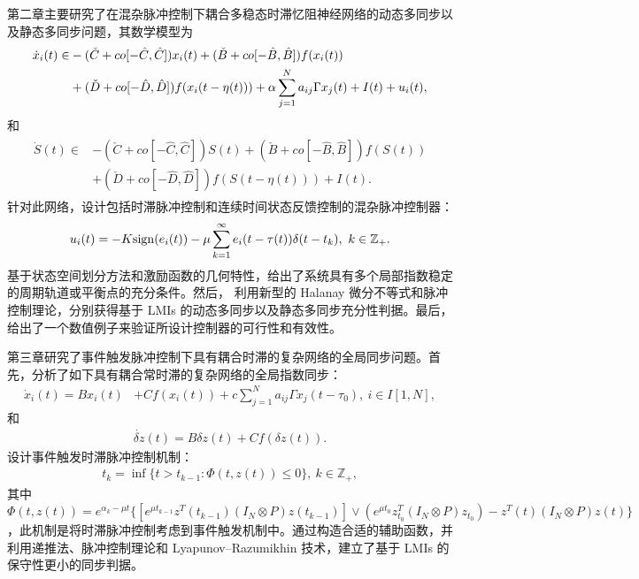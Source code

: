  
第二章主要研究了在混杂脉冲控制下耦合多稳态时滞忆阻神经网络的动态多同步以及静态多同步问题，其数学模型为
    \begin{align*} 
    \begin{split}
    \dot{x}_i(t)\in&- (\check{C}+co[-\hat{C},\hat{C}]) x_i(t)+(\check{B}+co[-\hat{B},\hat{B}])f(x_i(t)) \\
    &+(\check{D}+co[-\hat{D},\hat{D}])f(x_i(t-\eta(t)))
    +\alpha\sum\limits\limits_{j=1}^{N}a_{ij}\Gamma x_j(t)+I(t)+u_i(t),
    \end{split}
    \end{align*}
和 
    \begin{align*} 
    \begin{split}
    \dot{S}(t)\in&- (\check{C}+co[-\hat{C},\hat{C}]) S(t)+(\check{B}+co[-\hat{B},\hat{B}])f(S(t)) \\
    &+(\check{D}+co[-\hat{D},\hat{D}])f(S(t-\eta(t)))+I(t).
    \end{split}
    \end{align*}
针对此网络，设计包括时滞脉冲控制和连续时间状态反馈控制的混杂脉冲控制器：
\begin{align*} 
u_i(t)=-K {\rm sign}(e_i(t))-\mu\sum\limits_{k=1}^{\infty}e_i(t-\tau(t))\delta(t-t_k),\ k\in\mathbb{Z}_+.
\end{align*}
基于状态空间划分方法和激励函数的几何特性，给出了系统具有多个局部指数稳定的周期轨道或平衡点的充分条件。然后， 利用新型的 Halanay 微分不等式和脉冲控制理论，分别获得基于 LMIs 的动态多同步以及静态多同步充分性判据。最后，给出了一个数值例子来验证所设计控制器的可行性和有效性。
 
第三章研究了事件触发脉冲控制下具有耦合时滞的复杂网络的全局同步问题。首先，分析了如下具有耦合常时滞的复杂网络的全局指数同步： 
\begin{align*} 
\dot{x}_i(t)=Bx_i(t)&+Cf (x_i(t))+c\sum\limits_{j=1}^{N}a_{ij}\Gamma x_j(t-\tau_0),\ i\in I[1,N],
\end{align*}
和 \begin{align*} 
\dot{\delta z}(t)=B\delta z(t)+Cf(\delta z(t)).
\end{align*}
设计事件触发时滞脉冲控制机制： 
\begin{align*} 
t_k=\inf \{t>t_{k-1}:\Phi (t,z(t))\leq 0\},\ k\in\mathbb{Z}_+,
\end{align*}
其中 
$\Phi (t,z(t))=e^{\alpha_k-\mu t}\big\{[e^{\mu t_{k-1}}z^T (t_{k-1})(I_N\otimes P)z(t_{k-1})]\vee (e^{\mu t_0} z^T_{t_0}(I_N\otimes P)z_{t_0})-z^T (t)(I_N\otimes P)z(t)\big\}$，此机制是将时滞脉冲控制考虑到事件触发机制中。通过构造合适的辅助函数，并利用递推法、脉冲控制理论和 Lyapunov–Razumikhin 技术，建立了基于 LMIs 的保守性更小的同步判据。

